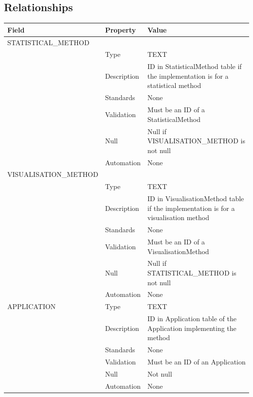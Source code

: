 \subsection{Relationships}\label{relationships-12}

\begin{longtable}[]{@{}
  >{\raggedright\arraybackslash}p{}
  >{\raggedright\arraybackslash}p{}
  >{\raggedright\arraybackslash}p{}@{}}
\toprule\noalign{}
\begin{minipage}[b]{\linewidth}\raggedright
Field
\end{minipage} & \begin{minipage}[b]{\linewidth}\raggedright
Property
\end{minipage} & \begin{minipage}[b]{\linewidth}\raggedright
Value
\end{minipage} \\
\midrule\noalign{}
\endhead
\bottomrule\noalign{}
\endlastfoot
STATISTICAL\_METHOD & & \\
& Type & TEXT \\
& Description & ID in StatisticalMethod table if the implementation is
for a statistical method \\
& Standards & None \\
& Validation & Must be an ID of a StatisticalMethod \\
& Null & Null if VISUALISATION\_METHOD is not null \\
& Automation & None \\
VISUALISATION\_METHOD & & \\
& Type & TEXT \\
& Description & ID in VisualisationMethod table if the implementation is
for a visualisation method \\
& Standards & None \\
& Validation & Must be an ID of a VisualisationMethod \\
& Null & Null if STATISTICAL\_METHOD is not null \\
& Automation & None \\
APPLICATION & Type & TEXT \\
& Description & ID in Application table of the Application implementing
the method \\
& Standards & None \\
& Validation & Must be an ID of an Application \\
& Null & Not null \\
& Automation & None \\
\end{longtable}

